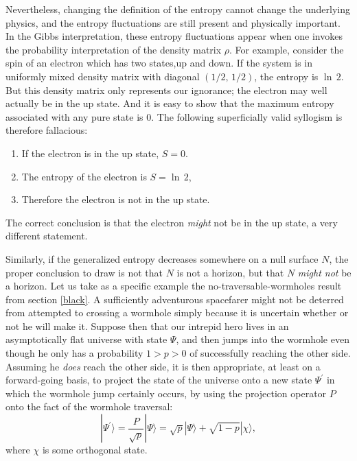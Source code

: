 \documentclass[12pt]{article}
\begin{document}
Nevertheless, changing the definition of the entropy cannot change the underlying physics, and the entropy fluctuations are still present and physically important.  In the Gibbs interpretation, these entropy fluctuations appear when one invokes the probability interpretation of the density matrix $\rho$.  For example, consider the spin of an electron which has two states,up and down.  If the system is in uniformly mixed density matrix with diagonal $(1/2,\,1/2)$, the entropy is $\ln\,2$.  But this density matrix only represents our ignorance; the electron may well actually be in the up state.  And it is easy to show that the maximum entropy associated with any pure state is 0.  The following superficially valid syllogism is therefore fallacious:
\begin{enumerate}
\item If the electron is in the up state, $S = 0$.
\item The entropy of the electron is $S = \ln\,2$,
\item Therefore the electron is not in the up state.
\end{enumerate}
The correct conclusion is that the electron \emph{might} not be in the up state, a very different statement.  

Similarly, if the generalized entropy decreases somewhere on a null surface $N$, the proper conclusion to draw is not that $N$ is not a horizon, but that $N$ \emph{might not} be a horizon.  Let us take as a specific example the no-traversable-wormholes result from section \ref{black}.  A sufficiently adventurous spacefarer might not be deterred from attempted to crossing a wormhole simply because it is uncertain whether or not he will make it.  Suppose then that our intrepid hero lives in an asymptotically flat universe with state $\Psi$, and then jumps into the wormhole even though he only has a probability $1 > p > 0$ of successfully reaching the other side.  Assuming he \emph{does} reach the other side, it is then appropriate, at least on a forward-going basis, to project the state of the universe onto a new state $\Psi^\prime$ in which the wormhole jump certainly occurs, by using the projection operator $P$ onto the fact of the wormhole traversal:
\begin{equation}
| \Psi^\prime \rangle = \frac{P}{\sqrt{p}} | \Psi \rangle 
= \sqrt{p} | \Psi \rangle + \sqrt{1 - p} | \chi \rangle,
\end{equation}
where $\chi$ is some orthogonal state.
\end{document}
